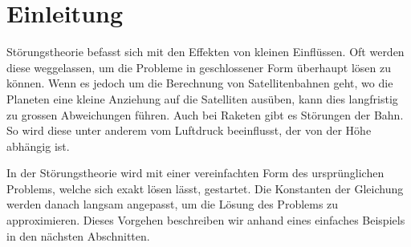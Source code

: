 \section{Einleitung\label{perturbation:section:einleitung}}
Störungstheorie befasst sich mit den Effekten von kleinen Einflüssen. 
Oft werden diese weggelassen, um die Probleme in geschlossener Form überhaupt lösen zu können. 
Wenn es jedoch um die Berechnung von Satellitenbahnen geht, wo die Planeten eine kleine Anziehung auf die Satelliten ausüben, kann dies langfristig zu grossen Abweichungen führen. 
Auch bei Raketen gibt es Störungen der Bahn. So wird diese unter anderem vom Luftdruck beeinflusst, der von der Höhe abhängig ist. 

In der Störungstheorie wird mit einer vereinfachten Form des ursprünglichen Problems, welche sich exakt lösen lässt, gestartet. 
Die Konstanten der Gleichung werden danach langsam angepasst, um die Lösung des Problems zu approximieren. 
Dieses Vorgehen beschreiben wir anhand eines einfaches Beispiels in den nächsten Abschnitten.


